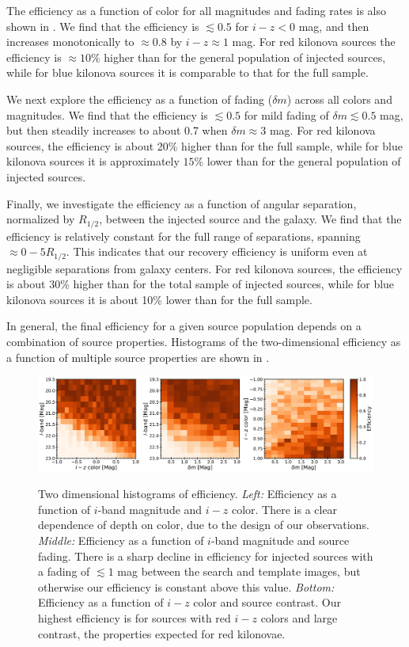 The efficiency as a function of color for all magnitudes and fading rates is also shown in . We find that the efficiency is $\lesssim 0.5$ for $i-z<0$ mag, and then increases monotonically to $\approx 0.8$ by $i-z\approx 1$ mag. For red kilonova sources the efficiency is $\approx10\%$ higher than for the general population of injected sources, while for blue kilonova sources it is comparable to that for the full sample.

We next explore the efficiency as a function of fading ($\delta m$) across all colors and magnitudes. We find that the efficiency is $\lesssim 0.5$ for mild fading of $\delta m\lesssim 0.5$ mag, but then steadily increases to about 0.7 when $\delta m\approx 3$ mag. For red kilonova sources, the efficiency is about 20\% higher than for the full sample, while for blue kilonova sources it is approximately $15$\% lower than for the general population of injected sources.

Finally, we investigate the efficiency as a function of angular separation, normalized by $R_{1/2}$, between the injected source and the galaxy. We find that the efficiency is relatively constant for the full range of separations, spanning $\approx 0-5 R_{1/2}$. This indicates that our recovery efficiency is uniform even at negligible separations from galaxy centers. For red kilonova sources, the efficiency is about 30\% higher than for the total sample of injected sources, while for blue kilonova sources it is about 10\% lower than for the full sample.

In general, the final efficiency for a given source population depends on a combination of source properties. Histograms of the two-dimensional efficiency as a function of multiple source properties are shown in .

\begin{figure}[!t]
\begin{center}
\hspace*{-0.1in}
\scalebox{1.}
{\includegraphics[width=\textwidth]{./figs/chapter3/f7alt.pdf}}
\caption{Two dimensional histograms of efficiency. {\it Left:} Efficiency as a function of $i$-band magnitude and $i-z$ color. There is a clear dependence of depth on color, due to the design of our observations. {\it Middle:} Efficiency as a function of $i$-band magnitude and source fading. There is a sharp decline in efficiency for injected sources with a fading of $\lesssim 1$ mag between the search and template images, but otherwise our efficiency is constant above this value. {\it Bottom:} Efficiency as a function of $i-z$ color and source contrast. Our highest efficiency is for sources with red $i-z$ colors and large contrast, the properties expected for red kilonovae.}
\label{fig:ch3_eff_2D}
\end{center}
\end{figure}

